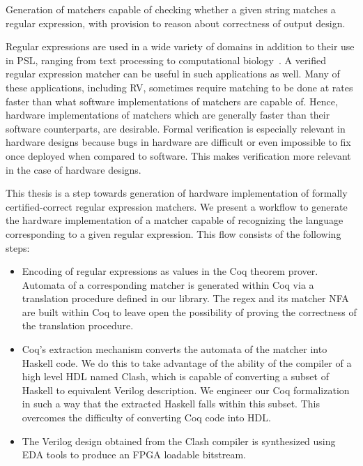 \begin{objective}
Generation of matchers capable of checking whether a given string
matches a regular expression, with provision to reason about
correctness of output design.
\end{objective}

Regular expressions are used in a wide variety of domains in addition
to their use in \gls{PSL}, ranging from text processing to
computational biology~\cite{stephens2005oracle}.
A verified regular expression matcher can be useful in such
applications as well.
Many of these applications, including \gls{RV}, sometimes require
matching to be done at rates faster than what software implementations
of matchers are capable of.
Hence, hardware implementations of matchers which are generally faster
than their software counterparts, are desirable.
Formal verification is especially relevant in hardware designs
because bugs in hardware are difficult or even impossible to fix once
deployed when compared to software.
This makes verification more relevant in the case of hardware designs.

This thesis is a step towards generation of hardware implementation of
formally certified-correct regular expression matchers.
We present a workflow to generate the hardware implementation of a
matcher capable of recognizing the language corresponding to a given
regular expression.
This flow consists of the following steps:

\begin{itemize}
\item
  Encoding of regular expressions as values in the Coq theorem prover.
  Automata of a corresponding matcher is generated within Coq via a 
  translation procedure defined in our library.
  The regex and its matcher NFA are built within Coq to leave open the
  possibility of proving the correctness of the translation procedure.
\item 
  Coq's extraction mechanism converts the automata of the matcher into
  Haskell code.
  We do this to take advantage of the ability of the compiler of a
  high level \gls{HDL} named Clash, which is capable of converting
  a subset of Haskell to equivalent Verilog description.
  We engineer our Coq formalization in such a way that the extracted
  Haskell falls within this subset.
  This overcomes the difficulty of converting Coq code into \gls{HDL}.
\item 
  The Verilog design obtained from the Clash compiler is synthesized
  using \gls{EDA} tools to produce an \gls{FPGA} loadable bitstream.
\end{itemize}

